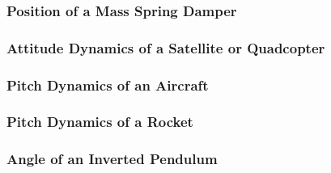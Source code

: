\subsubsection{Position of a Mass Spring Damper}

\subsubsection{Attitude Dynamics of a Satellite or Quadcopter}

\subsubsection{Pitch Dynamics of an Aircraft}

\subsubsection{Pitch Dynamics of a Rocket}

\subsubsection{Angle of an Inverted Pendulum}
